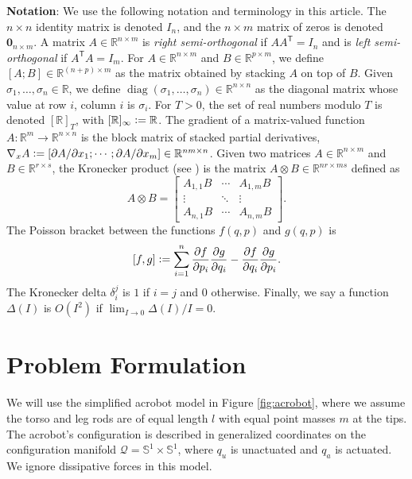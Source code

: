 \documentclass[journal,twoside,web, twocolumn,draftcls]{ieeecolor}
\DeclareMathOperator{\Diag}{diag}
\DeclareMathOperator{\interior}{int}
\newcommand*{\diag}[1]{\Diag\left(#1\right)}
\newcommand*{\tpose}{^\mathsf{T}}
\newcommand*{\Rt}[1]{[\R]_{#1}}
\newcommand*{\R}{\mathbb{R}}
\newcommand*{\Sone}{\mathbb{S}^1}
\newcommand*{\Id}[1]{I_{#1}}
\newcommand*{\Zmat}[1]{\bm{0}_{#1}}
\newcommand*{\pdiff}[2]{\frac{\partial #1}{\partial #2}}
\newcommand*{\eqdef}{\vcentcolon=}
\begin{document}
\textbf{Notation}:
We use the following notation and terminology in this article.
The \(n \times n\) identity matrix is denoted \(\Id{n}\), and the \(n \times m\)
matrix of zeros is denoted \(\Zmat{n\times m}\).
A matrix \(A \in \R^{n \times m}\) is \textit{right semi-orthogonal} if
\(A A\tpose = \Id{n}\) and is \textit{left semi-orthogonal} if 
\(A\tpose A = \Id{m}\).
For \(A \in \R^{n\times m}\) and \(B \in \R^{p \times m}\),
we define \([A;B] \in \R^{(n+p)\times m}\) as the matrix obtained by stacking \(A\)
on top of \(B\). 
Given \(\sigma_1,\ldots,\sigma_n \in \R\), we define 
\(\diag{\sigma_1,\ldots,\sigma_n} \in \R^{n \times n}\) as the diagonal matrix
whose value at row \(i\), column \(i\) is \(\sigma_i\).
For \(T > 0\), the set of real numbers modulo \(T\) is denoted \(\Rt{T}\), with
\(\Rt{\infty} \eqdef \R\). %
The gradient of a matrix-valued function 
\(A : \R^m \rightarrow \R^{n\times n}\) is the block matrix of stacked partial
derivatives, 
\(\nabla_xA \eqdef [\partial A/\partial x_1; \cdots; \partial A/\partial x_m] \in
\R^{nm \times n}\).
Given two matrices \(A \in \R^{n \times m}\) and \(B \in \R^{r \times s}\), the
Kronecker product (see \cite{kronprod}) is the matrix  
\(A \otimes B \in \R^{nr \times ms}\)  defined as
\begin{equation}\label{eqn:kronprod}
    A \otimes B = \begin{bmatrix}
        A_{1,1}B & \cdots & A_{1,m} B \\
        \vdots & \ddots & \vdots \\
        A_{n,1} B & \cdots & A_{n,m} B
    \end{bmatrix} 
    .
\end{equation}
The Poisson bracket \cite{landau_mechanics} between the functions
\(f(q,p)\) and \(g(q,p)\) is
\begin{equation}\label{eqn:poisson-bracket}
    [f,g] \eqdef \sum \limits_{i=1}^n \pdiff{f}{p_i}\pdiff{g}{q_i} - 
        \pdiff{f}{q_i}\pdiff{g}{p_i}
    .
\end{equation}
The Kronecker delta \(\delta_i^j\) is \(1\) if \(i = j\) and \(0\)
otherwise.
Finally, we say a function \(\Delta(I)\) is \(O(I^2)\)
if \(\lim_{I \to 0} \Delta(I)/I = 0\).

\section{Problem Formulation}\label{sec:problem-formulation}
We will use the simplified acrobot model in Figure
\ref{fig:acrobot}, where we assume the torso and leg rods are of
equal length \(l\) with equal point masses \(m\) at the tips.
The acrobot's configuration is described in generalized coordinates
 on the configuration manifold 
\(\mathcal{Q} = \Sone \times \Sone\), where \(q_u\) is unactuated and 
\(q_a\) is actuated.
We ignore dissipative forces in this model.
\end{document}
